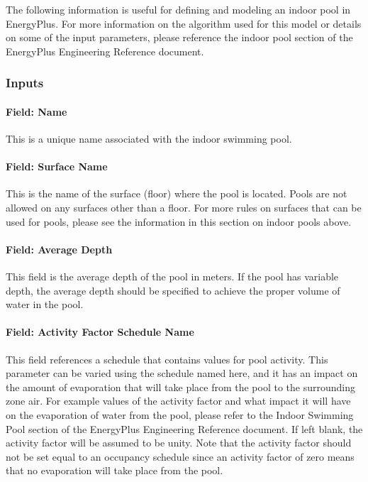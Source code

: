 The following information is useful for defining and modeling an indoor pool in EnergyPlus. For more information on the algorithm used for this model or details on some of the input parameters, please reference the indoor pool section of the EnergyPlus Engineering Reference document.

\subsubsection{Inputs}\label{inputs-7-012}

\paragraph{Field: Name}\label{field-name-7-008}

This is a unique name associated with the indoor swimming pool.

\paragraph{Field: Surface Name}\label{field-surface-name-1-000}

This is the name of the surface (floor) where the pool is located. Pools are not allowed on any surfaces other than a floor.  For more rules on surfaces that can be used for pools, please see the information in this section on indoor pools above.

\paragraph{Field: Average Depth}\label{field-average-depth}

This field is the average depth of the pool in meters. If the pool has variable depth, the average depth should be specified to achieve the proper volume of water in the pool.

\paragraph{Field: Activity Factor Schedule Name}\label{field-activity-factor-schedule-name}

This field references a schedule that contains values for pool activity. This parameter can be varied using the schedule named here, and it has an impact on the amount of evaporation that will take place from the pool to the surrounding zone air. For example values of the activity factor and what impact it will have on the evaporation of water from the pool, please refer to the Indoor Swimming Pool section of the EnergyPlus Engineering Reference document. If left blank, the activity factor will be assumed to be unity. Note that the activity factor should not be set equal to an occupancy schedule since an activity factor of zero means that no evaporation will take place from the pool.

